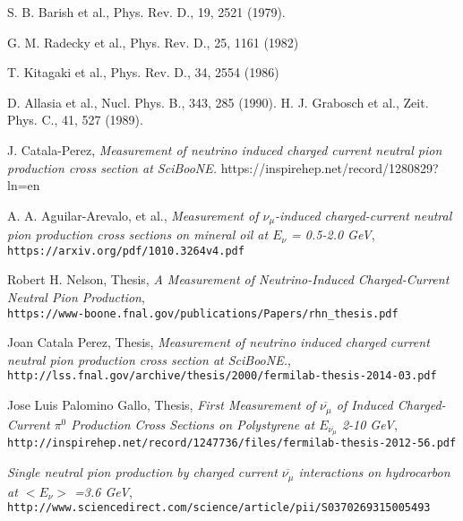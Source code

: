 \documentclass[12pt]{article}
\begin{document}
\clearpage
\begin{thebibliography}{9}


  S. B. Barish et al., Phys. Rev. D., 19, 2521 (1979).

 G. M. Radecky et al., Phys. Rev. D., 25, 1161 (1982)
 
 T. Kitagaki et al., Phys. Rev. D., 34, 2554 (1986)
 
 D. Allasia et al., Nucl. Phys. B., 343, 285 (1990).
 H. J. Grabosch et al., Zeit. Phys. C., 41, 527 (1989).

J. Catala-Perez, \emph{Measurement of neutrino induced charged current neutral pion production cross section at SciBooNE.}
https://inspirehep.net/record/1280829?ln=en

  A. A. Aguilar-Arevalo, et al., \emph{Measurement of $\nu_\mu$-induced charged-current neutral pion production cross sections on mineral oil at $E_\nu$ = 0.5-2.0 GeV},\\
  \texttt{https://arxiv.org/pdf/1010.3264v4.pdf}

  Robert H. Nelson, Thesis, \emph{A Measurement of Neutrino-Induced Charged-Current Neutral Pion Production},\\
  \texttt{https://www-boone.fnal.gov/publications/Papers/rhn\_thesis.pdf}
  
  Joan Catala Perez, Thesis, \emph{Measurement of neutrino induced charged current neutral pion production cross section at SciBooNE.},\\
  \texttt{http://lss.fnal.gov/archive/thesis/2000/fermilab-thesis-2014-03.pdf}  

  Jose Luis Palomino Gallo, Thesis, \emph{First Measurement of $\overline{\nu_\mu}$ of Induced Charged-Current $\pi^0$ Production Cross Sections on Polystyrene at $E_{\overline{\nu_\mu}}$ 2-10 GeV},\\
  \texttt{http://inspirehep.net/record/1247736/files/fermilab-thesis-2012-56.pdf}  
  
   \emph{Single neutral pion production by charged current $\overline{\nu_\mu}$ interactions on hydrocarbon at $< E_\nu >$ =3.6 GeV},\\
  \texttt{http://www.sciencedirect.com/science/article/pii/S0370269315005493}  
  

\end{thebibliography}
\end{document}
